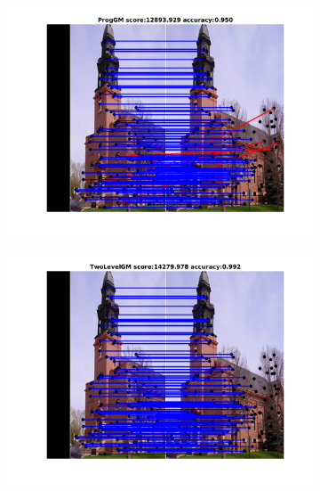 \documentclass[
	fontsize=12pt,
	paper=a4,
	twoside=false,
	numbers=noenddot,
	plainheadsepline,
	toc=listof,
	toc=bibliography
]{scrartcl}
\begin{document}
\begin{figure}[h]
	\begin{subfigure}[b]{0.33\textwidth}
		\centering
		\includegraphics[scale=0.25]{"fig_ver2608/RealImages/ImgTrafo/no_descr/using_cpd_afftrafo/fi_3_ProgGM"} 
	\end{subfigure}%
	\begin{subfigure}[b]{0.33\textwidth}
		\centering
		\includegraphics[scale=0.25]{"fig_ver2608/RealImages/ImgTrafo/no_descr/using_cpd_afftrafo/fi_3_TwoLevelGM"} 
	\end{subfigure} 
	\begin{subfigure}[b]{0.33\textwidth}
		\centering

\end{subfigure}
\end{figure}
\end{document}
